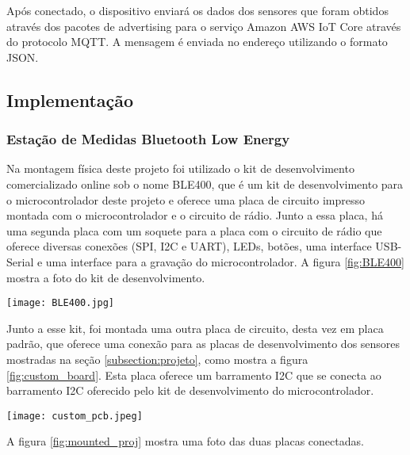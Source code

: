 Após conectado, o dispositivo enviará os dados dos sensores que foram obtidos
através dos pacotes de advertising para o serviço Amazon AWS IoT Core através do
protocolo MQTT. A mensagem é enviada no endereço 
utilizando o formato JSON.

\subsection{Implementação}

\subsubsection{Estação de Medidas Bluetooth Low Energy}


Na montagem física deste projeto foi utilizado o kit de desenvolvimento
comercializado online sob o nome BLE400, que é um kit de desenvolvimento para o
microcontrolador deste projeto e oferece uma placa de circuito impresso
montada com o microcontrolador e o circuito de rádio. Junto a essa placa, há uma
segunda placa com um soquete para a placa com o circuito de rádio que oferece
diversas conexões (SPI, I2C e UART), LEDs, botões, uma interface USB-Serial e
uma interface para a gravação do microcontrolador. A figura \ref{fig:BLE400}
mostra a foto do kit de desenvolvimento.

\begin{center}
	\centering 
	\texttt{[image: BLE400.jpg]}  
	\label{fig:BLE400}
\end{center} 

Junto a esse kit, foi montada uma outra placa de circuito, desta vez em placa
padrão, que oferece uma conexão para as placas de desenvolvimento dos sensores
mostradas na seção \ref{subsection:projeto}, como mostra a figura
\ref{fig:custom_board}. Esta placa oferece um barramento I2C que se conecta ao
barramento I2C oferecido pelo kit de desenvolvimento do microcontrolador.

\begin{center}
	\centering 
	\texttt{[image: custom\_pcb.jpeg]}
	\label{fig:custom_board}
\end{center} 

A figura \ref{fig:mounted_proj} mostra uma foto das duas placas conectadas.

